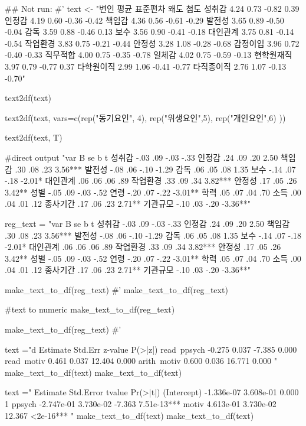 \documentclass[a4paper]{book}
\begin{document}
\begin{Examples}
\begin{ExampleCode}

\#\# Not run: 
#'
text <- "변인 평균 표준편차 왜도 첨도
성취감 4.24 0.73 -0.82 0.39
인정감 4.19 0.60 -0.36 -0.42
책임감 4.36 0.56 -0.61 -0.29
발전성 3.65 0.89 -0.50 -0.04
감독 3.59 0.88 -0.46 0.13
보수 3.56 0.90 -0.41 -0.18
대인관계 3.75 0.81 -0.14 -0.54
작업환경 3.83 0.75 -0.21 -0.44
안정성 3.28 1.08 -0.28 -0.68
감정이입 3.96 0.72 -0.40 -0.33
직무적합 4.00 0.75 -0.35 -0.78
일체감 4.02 0.75 -0.59 -0.13
현학원재직 3.97 0.79 -0.77 0.37
타학원이직 2.99 1.06 -0.41 -0.77
타직종이직 2.76 1.07 -0.13 -0.70"

text2df(text)

text2df(text, vars=c(rep("동기요인", 4),
              rep("위생요인",5), rep("개인요인",6)  ))

text2df(text, T)%

#direct output
"var B se b t
성취감 -.03 .09 -.03 -.33
인정감 .24 .09 .20 2.50
책임감 .30 .08 .23 3.56***
발전성 -.08 .06 -.10 -1.29
감독 .06 .05 .08 1.35
보수 -.14 .07 -.18 -2.01*
대인관계 .06 .06 .06 .89
작업환경 .33 .09 .34 3.82***
안정성 .17 .05 .26 3.42**
성별 -.05 .09 -.03 -.52
연령 -.20 .07 -.22 -3.01**
학력 .05 .07 .04 .70
소득 .00 .04 .01 .12
종사기간 .17 .06 .23 2.71**
기관규모 -.10 .03 -.20 -3.36**" %

reg_text = "var B se b t
성취감 -.03 .09 -.03 -.33
인정감 .24 .09 .20 2.50
책임감 .30 .08 .23 3.56***
발전성 -.08 .06 -.10 -1.29
감독 .06 .05 .08 1.35
보수 -.14 .07 -.18 -2.01*
대인관계 .06 .06 .06 .89
작업환경 .33 .09 .34 3.82***
안정성 .17 .05 .26 3.42**
성별 -.05 .09 -.03 -.52
연령 -.20 .07 -.22 -3.01**
학력 .05 .07 .04 .70
소득 .00 .04 .01 .12
종사기간 .17 .06 .23 2.71**
기관규모 -.10 .03 -.20 -3.36**"

make_text_to_df(reg_text)
#'
make_text_to_df(reg_text) %

#text to numeric
make_text_to_df(reg_text)%

make_text_to_df(reg_text)%
#'

text ="d           Estimate  Std.Err  z-value  P(>|z|)
  read~ppsych           -0.275    0.037   -7.385    0.000
    read~motiv             0.461    0.037   12.404    0.000
arith~motiv             0.600    0.036   16.771    0.000
"
make_text_to_df(text)
make_text_to_df(text) %

text ="             Estimate Std.Error tvalue Pr(>|t|)
(Intercept) -1.336e-07  3.608e-01   0.000        1
ppsych      -2.747e-01  3.730e-02  -7.363  7.51e-13***
motiv        4.613e-01  3.730e-02  12.367  <2e-16***
"
make_text_to_df(text) %
make_text_to_df(text) %



\end{ExampleCode}
\end{Examples}
\end{document}
